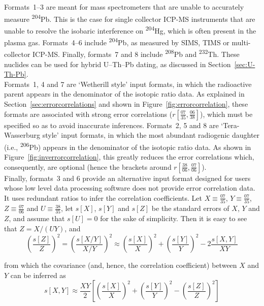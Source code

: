 \begin{refsection}
Formats~1--3 are meant for mass spectrometers that are unable to
accurately measure \textsuperscript{204}Pb. This is the case for
single collector ICP-MS instruments that are unable to resolve the
isobaric interference on \textsuperscript{204}Hg, which is often
present in the plasma gas. Formats~4--6 include
\textsuperscript{204}Pb, as measured by SIMS, TIMS or multi-collector
ICP-MS. Finally, formats~7 and 8 include \textsuperscript{208}Pb and
\textsuperscript{232}Th. These nuclides can be used for hybrid
U--Th--Pb dating, as discussed in Section~\ref{sec:U-Th-Pb}.\\

Formats~1, 4 and 7 are `Wetherill style' input formats, in which the
radioactive parent appears in the denominator of the isotopic ratio
data. As explained in Section~\ref{sec:errorcorrelations} and shown in
Figure~\ref{fig:errorcorrelation}, these formats are associated with
strong error correlations
($r\left[\frac{07}{35},\frac{06}{38}\right]$), which must be specified
so as to avoid inaccurate inferences.  Formats~2, 5 and 8 are
`Tera-Wasserburg style' input formats, in which the most abundant
radiogenic daughter (i.e., \textsuperscript{206}Pb) appears in the
denominator of the isotopic ratio data.  As shown in
Figure~\ref{fig:inverrorcorrelation}, this greatly reduces the error
correlations which, consequently, are optional (hence the brackets
around $r\left[\frac{38}{06},\frac{07}{06}\right]$).\\

Finally, formats~3 and 6 provide an alternative input format designed
for users whose low level data processing software does not provide
error correlation data. It uses redundant ratios to infer the
correlation coefficients. Let $X \equiv \frac{07}{35}$, $Y \equiv
\frac{07}{35}$, $Z \equiv \frac{07}{06}$ and $U \equiv \frac{38}{35}$,
let $s[X]$, $s[Y]$ and $s[Z]$ be the standard errors of $X$, $Y$ and
$Z$, and assume that $s[U]=0$ for the sake of simplicity. Then it is
easy to see that $Z = X/(U Y)$, and
\begin{equation}
  \left(\frac{s[Z]}{Z}\right)^2 = \left(\frac{s[X/Y]}{X/Y}\right)^2
  \approx \left(\frac{s[X]}{X}\right)^2 + \left(\frac{s[Y]}{Y}\right)^2 -
  2 \frac{s[X,Y]}{XY}
\end{equation}

\noindent from which the covariance (and, hence, the correlation
coefficient) between $X$ and $Y$ can be inferred as
\begin{equation}
  s[X,Y] \approx \frac{XY}{2}
  \left[
    \left(\frac{s[X]}{X}\right)^2 +
    \left(\frac{s[Y]}{Y}\right)^2 -
    \left(\frac{s[Z]}{Z}\right)^2
    \right]
\end{equation}


\end{refsection}
